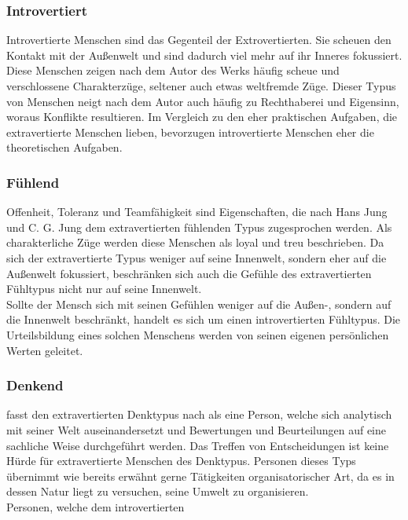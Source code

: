 \noindent
\cite{jung_2014}

\subsubsection{Introvertiert}

Introvertierte Menschen sind das Gegenteil der Extrovertierten. Sie scheuen den Kontakt mit der Außenwelt und sind dadurch viel mehr auf ihr Inneres fokussiert. Diese Menschen zeigen nach dem Autor \citeauthor{jung_2014} des Werks  häufig scheue und verschlossene Charakterzüge, seltener auch etwas weltfremde Züge. Dieser Typus von Menschen neigt nach dem Autor auch häufig zu Rechthaberei und Eigensinn, woraus Konflikte resultieren. Im Vergleich zu den eher praktischen Aufgaben, die extravertierte Menschen lieben, bevorzugen introvertierte Menschen eher die theoretischen Aufgaben.

\noindent
\cite{jung_2014}

\subsubsection{Fühlend}
Offenheit, Toleranz und Teamfähigkeit sind Eigenschaften, die nach Hans Jung und C. G. Jung dem extravertierten fühlenden Typus zugesprochen werden. Als charakterliche Züge werden diese Menschen als loyal und treu beschrieben. Da sich der extravertierte Typus weniger auf seine Innenwelt, sondern eher auf die Außenwelt fokussiert, beschränken sich auch die Gefühle des extravertierten Fühltypus nicht nur auf seine Innenwelt.\\
Sollte der Mensch sich mit seinen Gefühlen weniger auf die Außen-, sondern auf die Innenwelt beschränkt, handelt es sich um einen introvertierten Fühltypus. Die Urteilsbildung eines solchen Menschens werden von seinen eigenen persönlichen Werten geleitet. 

\noindent
\cite{jung_2014}
\subsubsection{Denkend}
\citeauthor{jung_2014} fasst den extravertierten Denktypus nach \citeauthor{jung_1921} als eine Person, welche sich analytisch mit seiner Welt auseinandersetzt und Bewertungen und Beurteilungen auf eine sachliche Weise durchgeführt werden. Das Treffen von Entscheidungen ist keine Hürde für extravertierte Menschen des Denktypus. Personen dieses Typs übernimmt wie bereits erwähnt gerne Tätigkeiten organisatorischer Art, da es in dessen Natur liegt zu versuchen, seine Umwelt zu organisieren.\\
Personen, welche dem introvertierten 



